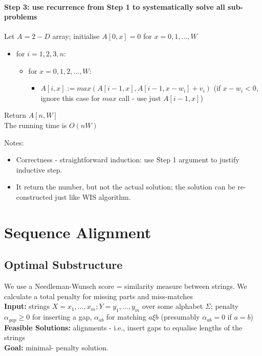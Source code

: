 \documentclass{scrartcl}
\begin{document}
\paragraph{Step 3: use recurrence from Step 1 to systematically solve all sub-problems}
Let $A = 2-D$ array; initialise $A[0, x] = 0$ for $x=0, 1, \dots, W$
\begin{itemize}
\item for $i = 1, 2, 3 \dot, n$:
  \begin{itemize}
  \item for $x = 0, 1, 2, \dots, W$:
    \begin{itemize}
    \item $A[i, x] := max(A[i-1, x], A[i-1, x-w_i] + v_i)$ (if $x-w_i < 0$,
      ignore this case for $max$ call - use just $A[i-1, x]$)
    \end{itemize}
  \end{itemize}
\end{itemize}
Return $A[n, W]$\\
The running time is $O(nW)$

Notes:
\begin{itemize}
\item Correctness - straightforward induction: use Step 1 argument to justify
  inductive step.
\item It return the number, but not the actual solution; the solution can be
  re-constructed just like WIS algorithm.
\end{itemize}

\section{Sequence Alignment}
\label{sec:11-1}
\subsection{Optimal Substructure}
\label{sec:11-1-1}
We use a Needleman-Wunsch score = similarity measure between strings. We
calculate a total penalty for missing parts and miss-matches\\
{\bf Input: } strings $X = x_1, \dots, x_m; Y = y_1, \dots, y_m$ over some
alphabet $\Sigma$; penalty $\alpha_{gap} \geq 0$ for inserting a gap,
$\alpha_{ab}$ for matching $a \xi b$ (presumably $\alpha_{ab} = 0$ if $a=b$)\\
{\bf Feasible Solutions: } alignments - i.e., insert gaps to equalise lengths of
the strings\\
{\bf Goal: } minimal- penalty solution.\\
\end{document}

